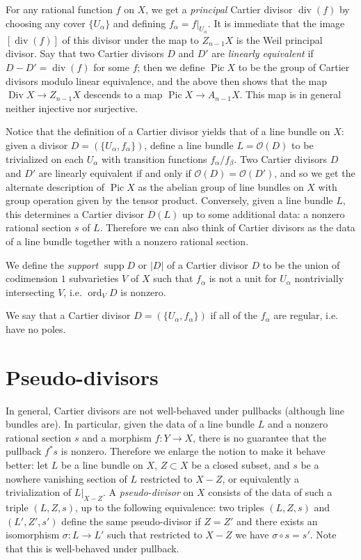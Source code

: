 \documentclass[leqno, openany]{memoir}
\theoremstyle{definition}
\theoremstyle{remark}
\theoremstyle{plain}
\theoremstyle{definition}
\theoremstyle{remark}
\newcommand{\mc}[1]{\mathcal{#1}}
\renewcommand{\div}{\operatorname{div}}
\DeclareMathOperator{\Pic}{Pic}
\DeclareMathOperator{\supp}{supp}
\DeclareMathOperator{\ord}{ord}
\DeclareMathOperator{\Div}{Div}
\begin{document}
For any rational function $f$ on $X$, we get a \textit{principal} Cartier divisor $\div(f)$ by choosing any cover $\{U_\alpha\}$ and defining $f_\alpha = f|_{U_\alpha}$. It is immediate that the image $[\div(f)]$ of this divisor under the map to $Z_{n-1}X$ is the Weil principal divisor. Say that two Cartier divisors $D$ and $D'$ are \textit{linearly equivalent} if $D - D' = \div(f)$ for some $f$; then we define $\Pic X$ to be the group of Cartier divisors modulo linear equivalence, and the above then shows that the map $\Div X \to Z_{n-1} X$ descends to a map $\Pic X \to A_{n-1} X$. This map is in general neither injective nor surjective.

Notice that the definition of a Cartier divisor yields that of a line bundle on $X$: given a divisor $D = (\{U_\alpha, f_\alpha\})$, define a line bundle $L = \mc{O}(D)$ to be trivialized on each $U_\alpha$ with transition functions $f_\alpha/f_\beta$. Two Cartier divisors $D$ and $D'$ are linearly equivalent if and only if $\mc{O}(D) = \mc{O}(D')$, and so we get the alternate description of $\Pic X$ as the abelian group of line bundles on $X$ with group operation given by the tensor product. Conversely, given a line bundle $L$, this determines a Cartier divisor $D(L)$ up to some additional data: a nonzero rational section $s$ of $L$. Therefore we can also think of Cartier divisors as the data of a line bundle together with a nonzero rational section.

We define the \textit{support} $\supp D$ or $|D|$ of a Cartier divisor $D$ to be the union of codimension $1$ subvarieties $V$ of $X$ such that $f_\alpha$ is not a unit for $U_\alpha$ nontrivially intersecting $V$, i.e. $\ord_V D$ is nonzero.

We say that a Cartier divisor $D = (\{U_\alpha, f_\alpha\})$ if all of the $f_\alpha$ are regular, i.e. have no poles.

\section{Pseudo-divisors}
In general, Cartier divisors are not well-behaved under pullbacks (although line bundles are). In particular, given the data of a line bundle $L$ and a nonzero rational section $s$ and a morphism $f\colon Y \to X$, there is no guarantee that the pullback $f^* s$ is nonzero. Therefore we enlarge the notion to make it behave better: let $L$ be a line bundle on $X$, $Z \subset X$ be a closed subset, and $s$ be a nowhere vanishing section of $L$ restricted to $X-Z$, or equivalently a trivialization of $L|_{X-Z}$. A \textit{pseudo-divisor} on $X$ consists of the data of such a triple $(L,Z,s)$, up to the following equivalence: two triples $(L,Z,s)$ and $(L',Z',s')$ define the same pseudo-divisor if $Z = Z'$ and there exists an isomorphism $\sigma\colon L \to L'$ such that restricted to $X-Z$ we have $\sigma \circ s = s'$. Note that this is well-behaved under pullback.
\end{document}
